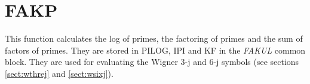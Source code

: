 \section{FAKP}
\label{sect:fakp}

\noindent This function calculates the log of primes, the factoring of
primes and the sum of factors of primes. They are stored in PILOG, IPI and
KF in the {\em FAKUL} common block. They are used for evaluating the Wigner
3-j and 6-j symbols (see sections \ref{sect:wthrej} and \ref{sect:wsixj}).\\

